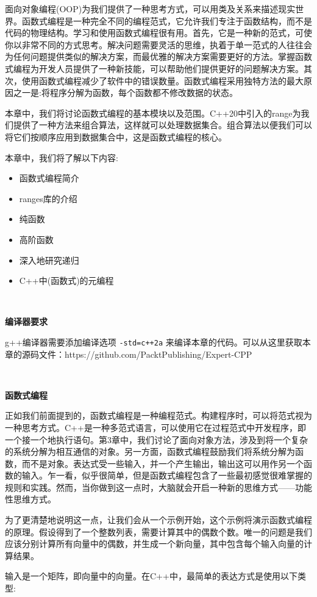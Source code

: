 面向对象编程(OOP)为我们提供了一种思考方式，可以用类及关系来描述现实世界。函数式编程是一种完全不同的编程范式，它允许我们专注于函数结构，而不是代码的物理结构。学习和使用函数式编程很有用。首先，它是一种新的范式，可使你以非常不同的方式思考。解决问题需要灵活的思维，执着于单一范式的人往往会为任何问题提供类似的解决方案，而最优雅的解决方案需要更好的方法。掌握函数式编程为开发人员提供了一种新技能，可以帮助他们提供更好的问题解决方案。其次，使用函数式编程减少了软件中的错误数量。函数式编程采用独特方法的最大原因之一是:将程序分解为函数，每个函数都不修改数据的状态。\par
本章中，我们将讨论函数式编程的基本模块以及范围。C++20中引入的range为我们提供了一种方法来组合算法，这样就可以处理数据集合。组合算法以便我们可以将它们按顺序应用到数据集合中，这是函数式编程的核心。 \par
本章中，我们将了解以下内容: \par

\begin{itemize}
	\item 函数式编程简介
	\item ranges库的介绍
	\item 纯函数
	\item 高阶函数
	\item 深入地研究递归
	\item C++中(函数式)的元编程
\end{itemize}

\noindent\textbf{}\ \par
\textbf{编译器要求} \ \par
g++编译器需要添加编译选项 \texttt{-std=c++2a} 来编译本章的代码。可以从这里获取本章的源码文件：https:/​/github.​com/PacktPublishing/Expert-CPP \par

\noindent\textbf{}\ \par
\textbf{函数式编程} \ \par
正如我们前面提到的，函数式编程是一种编程范式。构建程序时，可以将范式视为一种思考方式。C++是一种多范式语言，可以使用它在过程范式中开发程序，即一个接一个地执行语句。第3章中，我们讨论了面向对象方法，涉及到将一个复杂的系统分解为相互通信的对象。另一方面，函数式编程鼓励我们将系统分解为函数，而不是对象。表达式受一些输入，并一个产生输出，输出这可以用作另一个函数的输入。乍一看，似乎很简单，但是函数式编程包含了一些最初感觉很难掌握的规则和实践。然而，当你做到这一点时，大脑就会开启一种新的思维方式——功能性思维方式。 \par 
为了更清楚地说明这一点，让我们会从一个示例开始，这个示例将演示函数式编程的原理。假设得到了一个整数列表，需要计算其中的偶数个数。唯一的问题是我们应该分别计算所有向量中的偶数，并生成一个新向量，其中包含每个输入向量的计算结果。 \par
输入是一个矩阵，即向量中的向量。在C++中，最简单的表达方式是使用以下类型: \par

